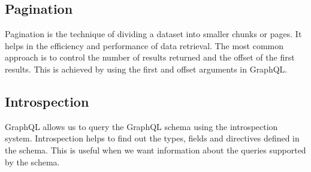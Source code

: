\subsection*{Pagination}
Pagination is the technique of dividing a dataset into smaller chunks or pages. It helps in the efficiency and performance of data retrieval. The most common approach is to control the number of results returned and the offset of the first results. This is achieved by using the first and offset arguments in GraphQL.

\subsection*{Introspection}
GraphQL allows us to query the GraphQL schema using the introspection system. Introspection helps to find out the types, fields and directives defined in the schema. This is useful when we want information about the queries supported by the schema.

